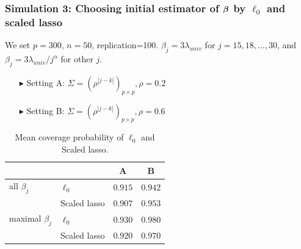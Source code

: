 \begin{frame}
\frametitle{Simulation 3: Choosing initial estimator of $\mbox{\boldmath $\beta$}$ by $\ell_0$ and scaled lasso}
We set $p=300$, $n=50$, replication=100. $\beta_{j}=3\lambda_{univ}$ for $j=15,18,\ldots,30$, and $\beta_{j}=3\lambda_{univ}/j^{\alpha}$ for other $j$.
\begin{itemize}
\item[$\blacktriangleright$] Setting A: $\Sigma=(\rho^{|j-k|})_{p\times p}, \rho = 0.2$
\item[$\blacktriangleright$] Setting B: $\Sigma=(\rho^{|j-k|})_{p\times p}, \rho = 0.6$
\end{itemize}
\begin{table}[ht]
\caption{Mean coverage probability of $\ell_{0}$ and Scaled lasso.}
\begin{tabular}{llcc}
\toprule
&&A&B\\
\midrule
all $\beta_j$ &$\ell_{0}$ & $0.915$ & $0.942$ \\
&Scaled lasso & $0.907$ & $0.953$ \\[1ex]
maximal $\beta_j$ &$\ell_{0}$ & $0.930$ & $0.980$ \\
&Scaled lasso & $0.920$ & $0.970$ \\
\bottomrule
\end{tabular}

\label{liu3}
\end{table}
\end{frame}
